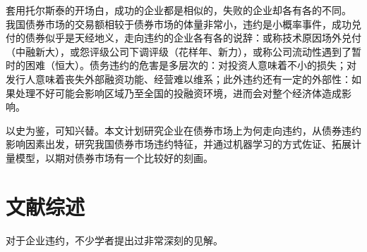 套用托尔斯泰的开场白，成功的企业都是相似的，失败的企业却各有各的不同。
我国债券市场的交易额相较于债券市场的体量非常小，违约是小概率事件，成功兑付的债券似乎是天经地义，走向违约的企业各有各的说辞：或称技术原因场外兑付（中融新大），或怨评级公司下调评级（花样年、新力），或称公司流动性遇到了暂时的困难（恒大）。债务违约的危害是多层次的：对投资人意味着不小的损失；对发行人意味着丧失外部融资功能、经营难以维系；此外违约还有一定的外部性：如果处理不好可能会影响区域乃至全国的投融资环境，进而会对整个经济体造成影响。

以史为鉴，可知兴替。本文计划研究企业在债券市场上为何走向违约，从债券违约影响因素出发，研究我国债券市场违约特征，并通过机器学习的方式佐证、拓展计量模型，以期对债券市场有一个比较好的刻画。

\section{文献综述}
\label{sec:zs}
对于企业违约，不少学者提出过非常深刻的见解。

